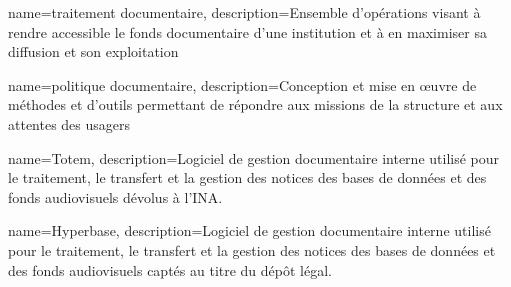 	
	{name={traitement documentaire},
	description={Ensemble d’opérations visant à rendre accessible le fonds documentaire d’une institution et à en maximiser sa diffusion et son exploitation}
}

{name={politique documentaire},
	description={Conception et mise en œuvre de méthodes et d’outils permettant de répondre aux missions de la structure et aux attentes des usagers}
}

{name={Totem},
	description={Logiciel de gestion documentaire interne utilisé pour le traitement, le transfert et la gestion des notices des bases de données et des fonds audiovisuels dévolus à l'INA.}
}

{name={Hyperbase},
	description={Logiciel de gestion documentaire interne utilisé pour le traitement, le transfert et la gestion des notices des bases de données et des fonds audiovisuels captés au titre du dépôt légal.}
}
 